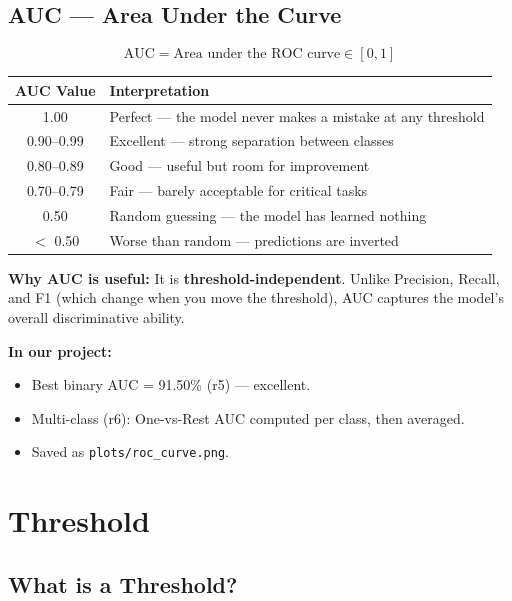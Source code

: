 \documentclass[11pt]{article}
\begin{document}
\subsection{AUC --- Area Under the Curve}

\[
\text{AUC} = \text{Area under the ROC curve} \in [0, 1]
\]

\begin{center}
\renewcommand{\arraystretch}{1.2}
\begin{tabular}{cl}
\toprule
\textbf{AUC Value} & \textbf{Interpretation} \\
\midrule
1.00 & Perfect --- the model never makes a mistake at any threshold \\
0.90--0.99 & Excellent --- strong separation between classes \\
0.80--0.89 & Good --- useful but room for improvement \\
0.70--0.79 & Fair --- barely acceptable for critical tasks \\
0.50 & Random guessing --- the model has learned nothing \\
$<$ 0.50 & Worse than random --- predictions are inverted \\
\bottomrule
\end{tabular}
\end{center}

\noindent\textbf{Why AUC is useful:} It is \textbf{threshold-independent}.
Unlike Precision, Recall, and F1 (which change when you move the threshold), AUC captures the model's overall discriminative ability.

\medskip
\noindent\textbf{In our project:}
\begin{itemize}[noitemsep]
    \item Best binary AUC = 91.50\% (r5) --- excellent.
    \item Multi-class (r6): One-vs-Rest AUC computed per class, then averaged.
    \item Saved as \texttt{plots/roc\_curve.png}.
\end{itemize}

\section{Threshold}

\subsection{What is a Threshold?}
\end{document}
